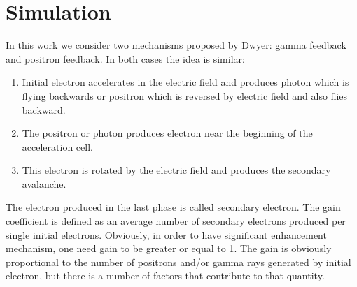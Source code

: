 \documentclass[utf8]{webofc}
\begin{document}
    \section{Simulation}
    In this work we consider two mechanisms proposed by Dwyer: gamma feedback and positron feedback. 
    In both cases the idea is similar:
    \begin{enumerate}
        
        \item Initial electron accelerates in the electric field and produces photon which is flying backwards or positron which is reversed by electric field and also flies backward.
        
        \item The positron or photon produces electron near the beginning of the acceleration cell.
        
        \item This electron is rotated by the electric field and produces the secondary avalanche. 
        
    \end{enumerate}
    
    The electron produced in the last phase is called secondary electron. The gain coefficient is defined as an average number of secondary electrons produced per single initial electrons. Obviously, in order to have significant enhancement mechanism, one need gain to be greater or equal to 1. 
    The gain is obviously proportional to the number of positrons and/or gamma rays generated by initial electron, but there is a number of factors that contribute to that quantity.
    
\end{document}
